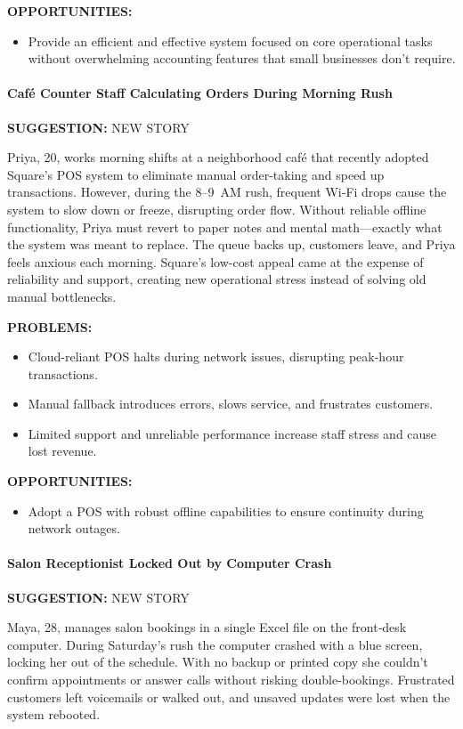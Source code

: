 \documentclass[]{VUMIFTemplateClass}
\newcommand{\suggestioncomment}[1]{%
    \definecolor{lime}{RGB}{50,205,50}%
    \begin{tcolorbox}[colback=lime!15, colframe=lime!60, arc=0pt, outer arc=0pt, boxrule=1pt, left=3pt, right=3pt, top=3pt, bottom=3pt]
        \textbf{\textcolor{lime!70!black}{SUGGESTION:}} #1
    \end{tcolorbox}%
}
\newcommand{\subsubsubsection}[1]{\paragraph{#1}}
\begin{document}
\textbf{OPPORTUNITIES:}
\begin{itemize}
    \item Provide an efficient and effective system focused on core operational tasks without
    overwhelming accounting features that small businesses don't require.
\end{itemize}

\subsubsubsection{Café Counter Staff Calculating Orders During Morning Rush}
\suggestioncomment{NEW STORY}
Priya, 20, works morning shifts at a neighborhood café that recently adopted
Square’s POS system to eliminate manual order-taking and speed up transactions.
However, during the 8--9~AM rush, frequent Wi‑Fi drops cause the system to slow
down or freeze, disrupting order flow. Without reliable offline functionality,
Priya must revert to paper notes and mental math—exactly what the system was
meant to replace. The queue backs up, customers leave, and Priya feels anxious
each morning. Square’s low-cost appeal came at the expense of reliability and
support, creating new operational stress instead of solving old manual
bottlenecks.

\textbf{PROBLEMS:}
\begin{itemize}
    \item Cloud-reliant POS halts during network issues, disrupting peak-hour transactions.
    \item Manual fallback introduces errors, slows service, and frustrates customers.
    \item Limited support and unreliable performance increase staff stress and cause lost revenue.
\end{itemize}

\textbf{OPPORTUNITIES:}
\begin{itemize}
    \item Adopt a POS with robust offline capabilities to ensure continuity during network outages.
\end{itemize}

\subsubsubsection{Salon Receptionist Locked Out by Computer Crash}
\suggestioncomment{NEW STORY}

Maya, 28, manages salon bookings in a single Excel file on the front‑desk computer.
During Saturday’s rush the computer crashed with a blue screen, locking her out
of the schedule. With no backup or printed copy she couldn’t confirm appointments
or answer calls without risking double‑bookings. Frustrated customers left
voicemails or walked out, and unsaved updates were lost when the system rebooted.
\end{document}
